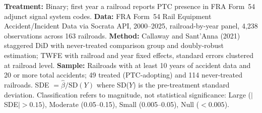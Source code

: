 \begin{table}[!t]
{\textbf{Treatment:} Binary; first year a railroad reports PTC presence in FRA Form~54 adjunct signal system codes.
\textbf{Data:} FRA Form~54 Rail Equipment Accident/Incident Data via Socrata API, 2000--2025, railroad-by-year panel, 4,238 observations across 163 railroads.
\textbf{Method:} Callaway and Sant'Anna (2021) staggered DiD with never-treated comparison group and doubly-robust estimation; TWFE with railroad and year fixed effects, standard errors clustered at railroad level.
\textbf{Sample:} Railroads with at least 10 years of accident data and 20 or more total accidents; 49 treated (PTC-adopting) and 114 never-treated railroads.
SDE $= \hat{\beta} / \text{SD}(Y)$ where SD($Y$) is the pre-treatment standard deviation. Classification refers to magnitude, not statistical significance: Large ($|$SDE$| > 0.15$), Moderate (0.05--0.15), Small (0.005--0.05), Null ($< 0.005$).
}
\end{table}
